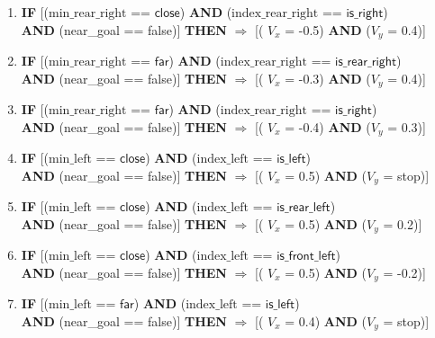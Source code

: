 \begin{enumerate}
	\item \textbf{IF} [($\text{min\_rear\_right}$ == $\textsf{close}$) \textbf{AND} ($\text{index\_rear\_right}$ == $\textsf{is\_right}$)\\
	\textbf{AND} (near\_goal == \textsf{false})]
	\textbf{THEN} $\Rightarrow$ [( $V_x$ = \textsf{-0.5}) \textbf{AND} ($V_y$ = \textsf{0.4})]
	
	\item \textbf{IF} [($\text{min\_rear\_right}$ == $\textsf{far}$) \textbf{AND} ($\text{index\_rear\_right}$ == $\textsf{is\_rear\_right}$)\\
	\textbf{AND} (near\_goal == \textsf{false})]
	\textbf{THEN} $\Rightarrow$ [( $V_x$ = \textsf{-0.3}) \textbf{AND} ($V_y$ = \textsf{0.4})]
	
	\item \textbf{IF} [($\text{min\_rear\_right}$ == $\textsf{far}$) \textbf{AND} ($\text{index\_rear\_right}$ == $\textsf{is\_right}$)\\
	\textbf{AND} (near\_goal == \textsf{false})]
	\textbf{THEN} $\Rightarrow$ [( $V_x$ = \textsf{-0.4}) \textbf{AND} ($V_y$ = \textsf{0.3})]
	
	\item \textbf{IF} [($\text{min\_left}$ == $\textsf{close}$) \textbf{AND} ($\text{index\_left}$ == $\textsf{is\_left}$)\\
	\textbf{AND} (near\_goal == \textsf{false})]
	\textbf{THEN} $\Rightarrow$ [( $V_x$ = \textsf{0.5}) \textbf{AND} ($V_y$ = \textsf{stop})]
	
	\item \textbf{IF} [($\text{min\_left}$ == $\textsf{close}$) \textbf{AND} ($\text{index\_left}$ == $\textsf{is\_rear\_left}$)\\
	\textbf{AND} (near\_goal == \textsf{false})]
	\textbf{THEN} $\Rightarrow$ [( $V_x$ = \textsf{0.5}) \textbf{AND} ($V_y$ = \textsf{0.2})]
	
	\item \textbf{IF} [($\text{min\_left}$ == $\textsf{close}$) \textbf{AND} ($\text{index\_left}$ == $\textsf{is\_front\_left}$)\\
	\textbf{AND} (near\_goal == \textsf{false})]
	\textbf{THEN} $\Rightarrow$ [( $V_x$ = \textsf{0.5}) \textbf{AND} ($V_y$ = \textsf{-0.2})]
	
	\item \textbf{IF} [($\text{min\_left}$ == $\textsf{far}$) \textbf{AND} ($\text{index\_left}$ == $\textsf{is\_left}$)\\
	\textbf{AND} (near\_goal == \textsf{false})]
	\textbf{THEN} $\Rightarrow$ [( $V_x$ = \textsf{0.4}) \textbf{AND} ($V_y$ = \textsf{stop})]
	

\end{enumerate}
